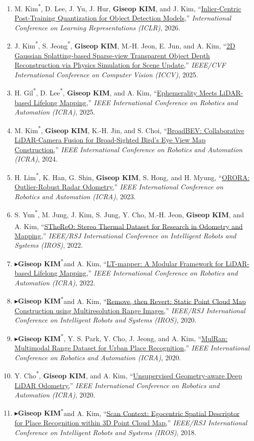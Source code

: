 \documentclass[10pt,a4paper]{article}
\newcommand{\pub}[2]{\Needspace{4\baselineskip}\item[#1.] #2}
\newcommand{\leadpub}{\textbf{\ensuremath{\blacktriangleright}}\hspace{0.25em}}
\newcommand{\me}{\textbf{Giseop KIM}}
\newcommand{\corr}{\textsuperscript{\dag}}
\newcommand{\first}{\textsuperscript{*}}
\begin{document}
\begin{enumerate}
\pub{C11}{M. Kim\first, D. Lee, J. Yu, J. Hur, \me, and J. Kim\corr, ``\href{https://arxiv.org/abs/2602.03472}{Inlier-Centric Post-Training Quantization for Object Detection Models,}'' \textit{International Conference on Learning Representations (ICLR)}, 2026.}
\pub{C10}{J. Kim\first, S. Jeong\first, \me, M.-H. Jeon, E. Jun, and A. Kim\corr, ``\href{https://arxiv.org/abs/2507.11069}{2D Gaussian Splatting-based Sparse-view Transparent Object Depth Reconstruction via Physics Simulation for Scene Update,}'' \textit{IEEE/CVF International Conference on Computer Vision (ICCV)}, 2025.}
\pub{C9}{H. Gil\first, D. Lee\first, \me, and A. Kim\corr, ``\href{https://arxiv.org/abs/2502.13452}{Ephemerality Meets LiDAR-based Lifelong Mapping,}'' \textit{IEEE International Conference on Robotics and Automation (ICRA)}, 2025.}
\pub{C8}{M. Kim\first, \me, K.-H. Jin, and S. Choi\corr, ``\href{https://arxiv.org/abs/2309.11119}{BroadBEV: Collaborative LiDAR-Camera Fusion for Broad-Sighted Bird's Eye View Map Construction,}'' \textit{IEEE International Conference on Robotics and Automation (ICRA)}, 2024.}
\pub{C7}{H. Lim\first, K. Han, G. Shin, \me, S. Hong, and H. Myung\corr, ``\href{https://arxiv.org/abs/2303.01876}{ORORA: Outlier-Robust Radar Odometry,}'' \textit{IEEE International Conference on Robotics and Automation (ICRA)}, 2023.}
\pub{C6}{S. Yun\first, M. Jung, J. Kim, S. Jung, Y. Cho, M.-H. Jeon, \me, and A. Kim\corr, ``\href{https://rpm.snu.ac.kr/publications/ssyun-2022-iros.pdf}{STheReO: Stereo Thermal Dataset for Research in Odometry and Mapping,}'' \textit{IEEE/RSJ International Conference on Intelligent Robots and Systems (IROS)}, 2022.}
\pub{C5}{\leadpub \me\first and A. Kim\corr, ``\href{https://gisbi-kim.github.io/uploads/gkim-2021-ltmapper.pdf}{LT-mapper: A Modular Framework for LiDAR-based Lifelong Mapping,}'' \textit{IEEE International Conference on Robotics and Automation (ICRA)}, 2022.}
\pub{C4}{\leadpub \me\first and A. Kim\corr, ``\href{https://gisbi-kim.github.io/uploads/gkim-2020-iros.pdf}{Remove, then Revert: Static Point Cloud Map Construction using Multiresolution Range Images,}'' \textit{IEEE/RSJ International Conference on Intelligent Robots and Systems (IROS)}, 2020.}
\pub{C3}{\leadpub \me\first, Y. S. Park, Y. Cho, J. Jeong, and A. Kim\corr, ``\href{https://gisbi-kim.github.io/uploads/gkim-2020-icra.pdf}{MulRan: Multimodal Range Dataset for Urban Place Recognition,}'' \textit{IEEE International Conference on Robotics and Automation (ICRA)}, 2020.}
\pub{C2}{Y. Cho\first, \me, and A. Kim\corr, ``\href{https://gisbi-kim.github.io/uploads/ycho-2020-icra.pdf}{Unsupervised Geometry-aware Deep LiDAR Odometry,}'' \textit{IEEE International Conference on Robotics and Automation (ICRA)}, 2020.}
\pub{C1}{\leadpub \me\first and A. Kim\corr, ``\href{https://gisbi-kim.github.io/uploads/gkim-2018-iros.pdf}{Scan Context: Egocentric Spatial Descriptor for Place Recognition within 3D Point Cloud Map,}'' \textit{IEEE/RSJ International Conference on Intelligent Robots and Systems (IROS)}, 2018.}
\end{enumerate}
\end{document}
